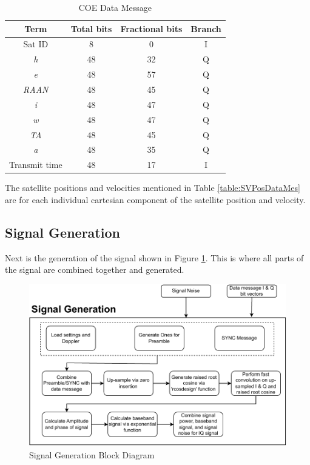 \documentclass[12pt]{report}
\begin{document}
\begin{table}
    \begin{center}
        \begin{tabular}{|c|c|c|c|}
            \hline
            Term & Total bits & Fractional bits & Branch \\
            \hline
            Sat ID & 8 & 0 & I \\
            \hline
            \textit{h} & 48 & 32 & Q \\
            \hline
            \textit{e} & 48 & 57 & Q \\
            \hline
            \textit{RAAN} & 48 & 45 & Q \\
            \hline
            \textit{i} & 48 & 47 & Q \\
            \hline
            \textit{w} & 48 & 47 & Q \\
            \hline
            \textit{TA} & 48 & 45 & Q \\
            \hline
            \textit{a} & 48 & 35 & Q \\
            \hline
            Transmit time & 48 & 17 & I \\
            \hline
        \end{tabular}
    \end{center}
    \caption{COE Data Message}
    \label{table:COEdatMes}
\end{table}
The satellite positions and velocities mentioned in Table \ref{table:SVPosDataMes} are for each individual cartesian component of the satellite position and velocity.

\subsection{Signal Generation}\label{sec:signalgen}
Next is the generation of the signal shown in Figure \ref{fig:SigGenBlock}. This is where all parts of the signal are combined together and generated. 

\begin{figure}[h]
    \centering
    \includegraphics[width=5in]{Overall Simulation Diagram-Signal Generation.drawio.pdf}
    \caption{Signal Generation Block Diagram}
    \label{fig:SigGenBlock}
\end{figure}
\end{document}
